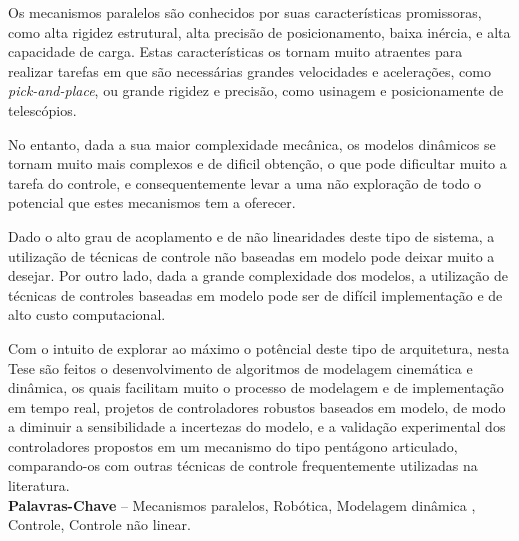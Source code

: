 \documentclass[]{politex}
\begin{document}


\begin{resumo}
Os mecanismos paralelos são conhecidos por suas características promissoras, como alta rigidez estrutural,  alta precisão de posicionamento, baixa inércia, e alta capacidade de carga. Estas características os tornam muito atraentes para realizar tarefas em que são necessárias grandes velocidades e acelerações, como {\em pick-and-place}, ou grande rigidez e precisão, como usinagem e posicionamente de telescópios.

No entanto, dada a sua maior complexidade mecânica, os modelos dinâmicos se tornam muito mais complexos e de dificil obtenção, o que pode dificultar muito a tarefa do controle, e consequentemente levar a uma não exploração de todo o potencial que estes mecanismos tem a oferecer.

Dado o alto grau de acoplamento e de não linearidades deste tipo de sistema, a utilização de técnicas de controle não baseadas em modelo pode deixar muito a desejar. Por outro lado, dada a grande complexidade dos modelos, a utilização de técnicas de controles baseadas em modelo pode ser de difícil implementação e de alto custo computacional.

Com o intuito de explorar ao máximo o potêncial deste tipo de arquitetura, nesta Tese são feitos o desenvolvimento de algoritmos de modelagem cinemática e dinâmica, os quais facilitam muito o processo de modelagem e de implementação em tempo real, projetos de controladores robustos baseados em modelo, de modo a diminuir a sensibilidade a incertezas do modelo, e a validação experimental dos controladores propostos em um mecanismo do tipo pentágono articulado, comparando-os com outras técnicas de controle frequentemente utilizadas na literatura.
%
\\[3\baselineskip]
%


\textbf{Palavras-Chave} -- Mecanismos paralelos, Robótica, Modelagem dinâmica , Controle, Controle não linear.
\end{resumo}
\end{document}
